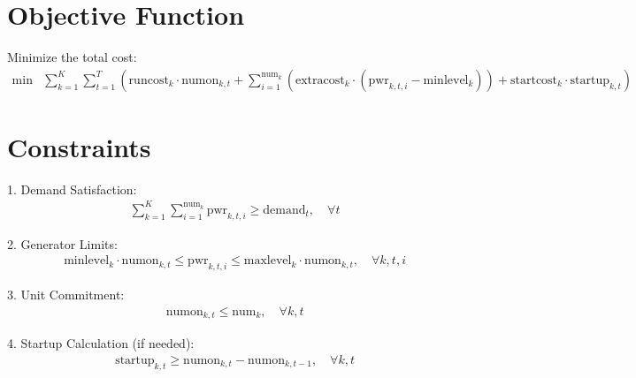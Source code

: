 \documentclass{article}
\begin{document}
\section*{Objective Function}
Minimize the total cost:
\begin{align*}
\min & \sum_{k=1}^K \sum_{t=1}^T \left( \text{runcost}_k \cdot \text{numon}_{k,t} + \sum_{i=1}^{\text{num}_k} \left( \text{extracost}_k \cdot (\text{pwr}_{k,t,i} - \text{minlevel}_k) \right) + \text{startcost}_k \cdot \text{startup}_{k,t} \right)
\end{align*}

\section*{Constraints}
1. Demand Satisfaction:
\begin{align*}
& \sum_{k=1}^K \sum_{i=1}^{\text{num}_k} \text{pwr}_{k,t,i} \geq \text{demand}_t, \quad \forall t
\end{align*}

2. Generator Limits:
\begin{align*}
& \text{minlevel}_k \cdot \text{numon}_{k,t} \leq \text{pwr}_{k,t,i} \leq \text{maxlevel}_k \cdot \text{numon}_{k,t}, \quad \forall k, t, i
\end{align*}

3. Unit Commitment:
\begin{align*}
& \text{numon}_{k,t} \leq \text{num}_k, \quad \forall k, t
\end{align*}

4. Startup Calculation (if needed):
\begin{align*}
& \text{startup}_{k,t} \geq \text{numon}_{k,t} - \text{numon}_{k,t-1}, \quad \forall k, t
\end{align*}
\end{document}
